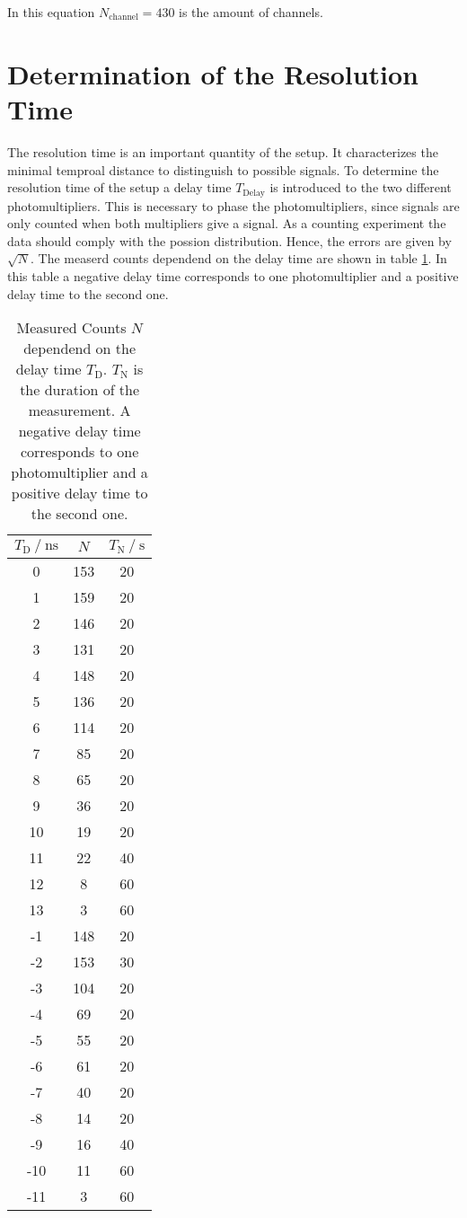 In this equation $N_\mathrm{channel} = 430$ is the amount of channels.

\section{Determination of the Resolution Time}
\label{sec:resoltion time}
The resolution time is an important quantity of the setup. It characterizes the minimal temproal distance to distinguish to possible signals.%
To determine the resolution time of the setup a delay time $T_\mathrm{Delay}$ is introduced to the two different photomultipliers. This is necessary to phase the photomultipliers,
since signals are only counted when both multipliers give a signal. As a counting experiment the data should comply with the possion distribution. Hence, the errors are given 
by $\sqrt{N}$. The measerd counts dependend on the delay time are shown in table \ref{tab:t_d}. In this table a negative delay time corresponds to one photomultiplier and a positive 
delay time to the second one. 

\begin{table}
    \tiny
    \centering
    \caption{Measured Counts $N$ dependend on the delay time $T_\text{D}$. $T_\mathrm{N}$ is the duration of the measurement. A negative delay time corresponds to one photomultiplier
    and a positive delay time to the second one.}
    \label{tab:t_d}
    \begin{tabular}{c c c}
      \toprule
      {$ T_\text{D} \mathbin{/} \unit{\nano\second}$} & {$N$} & {$T_\mathrm{N} \mathbin{/} \unit{\second}$} \\
      \midrule
    0  & 153 & 20 \\
    1  & 159 & 20 \\
    2  & 146 & 20 \\
    3  & 131 & 20 \\
    4  & 148 & 20 \\
    5  & 136 & 20 \\
    6  & 114 & 20 \\
    7  & 85 & 20 \\
    8  & 65 & 20 \\
    9  & 36 & 20 \\
    10 & 19 & 20 \\
    11 & 22 & 40 \\
    12 & 8  & 60 \\
    13 & 3  & 60 \\
    -1 & 148 & 20 \\
    -2 & 153 & 30 \\
    -3 & 104 & 20 \\
    -4 & 69 & 20 \\
    -5 & 55 & 20 \\
    -6 & 61 & 20 \\
    -7 & 40 & 20 \\
    -8 & 14 & 20 \\
    -9 & 16 & 40 \\
    -10& 11 & 60 \\
    -11& 3 & 60 \\
    \bottomrule
    \end{tabular}
\end{table}


